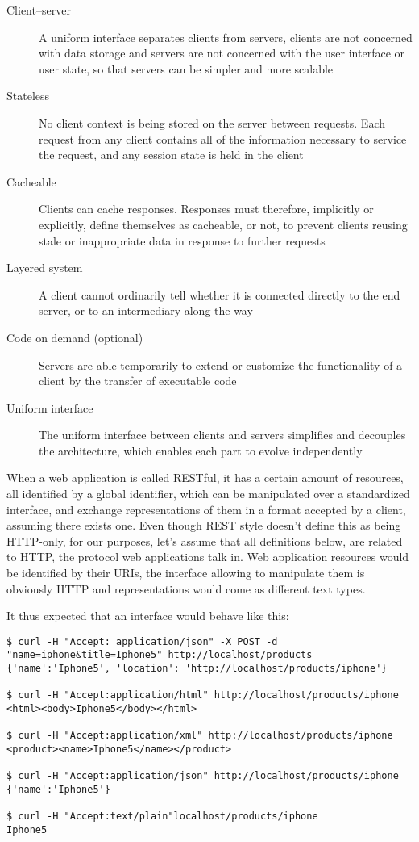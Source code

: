 \begin{description}
  \item[Client–server] A uniform interface separates clients from servers, clients are not concerned with data storage and servers are not concerned with the user interface or user state, so that servers can be simpler and more scalable
  \item[Stateless] No client context is being stored on the server between requests. Each request from any client contains all of the information necessary to service the request, and any session state is held in the client
  \item[Cacheable] Clients can cache responses. Responses must therefore, implicitly or explicitly, define themselves as cacheable, or not, to prevent clients reusing stale or inappropriate data in response to further requests
  \item[Layered system] A client cannot ordinarily tell whether it is connected directly to the end server, or to an intermediary along the way
  \item[Code on demand (optional)] Servers are able temporarily to extend or customize the functionality of a client by the transfer of executable code
  \item[Uniform interface] The uniform interface between clients and servers simplifies and decouples the architecture, which enables each part to evolve independently
\end{description}

When a web application is called RESTful, it has a certain amount of resources, all identified by a global identifier, which can be manipulated over a standardized interface, and exchange representations of them in a format accepted by a client, assuming there exists one. Even though REST style doesn't define this as being HTTP-only, for our purposes, let's assume that all definitions below, are related to HTTP, the protocol web applications talk in. Web application resources would be identified by their URIs, the interface allowing to manipulate them is obviously HTTP and representations would come as different text types.

It thus expected that an interface would behave like this:

\begin{codelisting}
\begin{verbatim}
$ curl -H "Accept: application/json" -X POST -d "name=iphone&title=Iphone5" http://localhost/products
{'name':'Iphone5', 'location': 'http://localhost/products/iphone'}

$ curl -H "Accept:application/html" http://localhost/products/iphone
<html><body>Iphone5</body></html>

$ curl -H "Accept:application/xml" http://localhost/products/iphone
<product><name>Iphone5</name></product>

$ curl -H "Accept:application/json" http://localhost/products/iphone
{'name':'Iphone5'}

$ curl -H "Accept:text/plain"localhost/products/iphone
Iphone5
\end{verbatim}
\end{codelisting}

